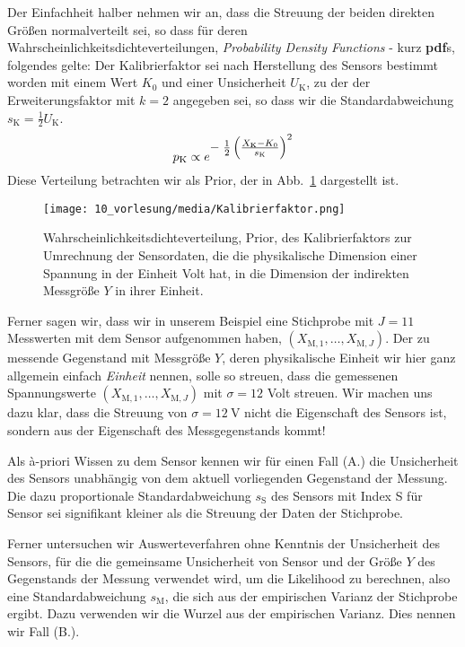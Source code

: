 Der Einfachheit halber nehmen wir an, dass die Streuung der beiden direkten Größen
normalverteilt sei, so dass für deren Wahrscheinlichkeitsdichteverteilungen,
\textsl{Probability Density Functions} - kurz \textbf{pdf}s, folgendes gelte:
Der Kalibrierfaktor sei nach Herstellung des Sensors bestimmt worden mit einem Wert
$K_0$ und einer Unsicherheit $U_\mathrm{K}$, zu der der Erweiterungsfaktor mit $k = 2$
angegeben sei, so dass wir die Standardabweichung $s_\mathrm{K} = \frac{1}{2} U_\mathrm{K}$.
\begin{equation}
p_\mathrm{K} \propto
 e^{\textstyle -\;\frac{1}{2} \left(\frac{ X_\mathrm{K} - K_0}{s_\mathrm{K}} \right)^2}
\label{PriorKalibrierfaktor}
\end{equation}
Diese Verteilung betrachten wir als Prior, der in Abb.~\ref{fig:Kalibrierfaktor} dargestellt ist.
\begin{figure}[!htp]
	\begin{center}
		\texttt{[image: 10\_vorlesung/media/Kalibrierfaktor.png]}
		\caption{Wahrscheinlichkeitsdichteverteilung, Prior, des
		Kalibrierfaktors zur Umrechnung der Sensordaten, die die physikalische
		Dimension einer Spannung in der Einheit Volt hat, in die Dimension der
		indirekten Messgröße $Y$ in ihrer Einheit.}
		\label{fig:Kalibrierfaktor}
	\end{center}
\end{figure}
Ferner sagen wir, dass wir in unserem Beispiel eine Stichprobe mit $J = 11$ Messwerten
mit dem Sensor aufgenommen haben, $(X_{\mathrm{M},1}, \dots, X_{\mathrm{M},J})$.
Der zu messende Gegenstand mit Messgröße $Y$, deren physikalische Einheit wir hier
ganz allgemein einfach \textsl{Einheit} nennen, solle so streuen, dass die gemessenen
Spannungswerte $(X_{\mathrm{M},1}, \dots, X_{\mathrm{M},J})$ mit $\sigma = 12$ Volt streuen.
Wir machen uns dazu klar, dass die Streuung von $\sigma = 12~\mathrm{V}$ nicht die Eigenschaft
des Sensors ist, sondern aus der Eigenschaft des Messgegenstands kommt!

Als {\`a}-priori Wissen zu dem Sensor kennen wir für einen Fall (A.) die Unsicherheit des
Sensors unabhängig von dem aktuell vorliegenden Gegenstand der Messung. Die dazu
proportionale Standardabweichung $s_\mathrm{S}$ des Sensors mit Index S für Sensor sei
signifikant kleiner als die Streuung der Daten der Stichprobe.

Ferner untersuchen wir Auswerteverfahren ohne Kenntnis der Unsicherheit des Sensors, für die
die gemeinsame Unsicherheit von Sensor und der Größe $Y$ des Gegenstands der Messung verwendet
wird, um die Likelihood zu berechnen, also eine Standardabweichung $s_\mathrm{M}$, die sich aus
der empirischen Varianz der Stichprobe ergibt. Dazu verwenden wir die Wurzel aus der empirischen
Varianz. Dies nennen wir Fall (B.).

